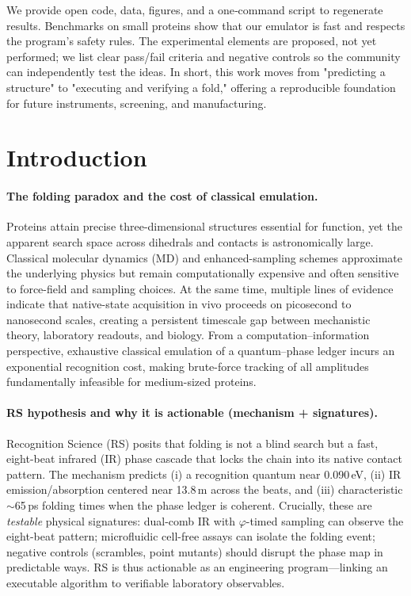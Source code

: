\documentclass[12pt,a4paper]{article}
\begin{document}
We provide open code, data, figures, and a one‑command script to regenerate results. Benchmarks on small proteins show that our emulator is fast and respects the program's safety rules. The experimental elements are proposed, not yet performed; we list clear pass/fail criteria and negative controls so the community can independently test the ideas. In short, this work moves from "predicting a structure" to "executing and verifying a fold," offering a reproducible foundation for future instruments, screening, and manufacturing.

\section{Introduction}

\paragraph{The folding paradox and the cost of classical emulation.}
Proteins attain precise three-dimensional structures essential for function, yet the apparent search space across dihedrals and contacts is astronomically large. Classical molecular dynamics (MD) and enhanced-sampling schemes approximate the underlying physics but remain computationally expensive and often sensitive to force-field and sampling choices. At the same time, multiple lines of evidence indicate that native-state acquisition in vivo proceeds on picosecond to nanosecond scales, creating a persistent timescale gap between mechanistic theory, laboratory readouts, and biology. From a computation–information perspective, exhaustive classical emulation of a quantum–phase ledger incurs an exponential recognition cost, making brute-force tracking of all amplitudes fundamentally infeasible for medium-sized proteins.

\paragraph{RS hypothesis and why it is actionable (mechanism + signatures).}
Recognition Science (RS) posits that folding is not a blind search but a fast, eight-beat infrared (IR) phase cascade that locks the chain into its native contact pattern. The mechanism predicts (i) a recognition quantum near 0.090\,eV, (ii) IR emission/absorption centered near 13.8\,\textmu m across the beats, and (iii) characteristic $\sim$65\,ps folding times when the phase ledger is coherent. Crucially, these are \emph{testable} physical signatures: dual-comb IR with $\varphi$-timed sampling can observe the eight-beat pattern; microfluidic cell-free assays can isolate the folding event; negative controls (scrambles, point mutants) should disrupt the phase map in predictable ways. RS is thus actionable as an engineering program—linking an executable algorithm to verifiable laboratory observables.
\end{document}
